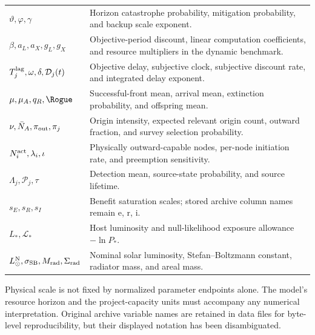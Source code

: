 \begin{longtable}{@{}p{}p{}@{}}
$\vartheta,\varphi,\gamma$ & Horizon catastrophe probability, mitigation probability, and backup scale exponent.\\
$\beta,a_L,a_X,g_L,g_X$ & Objective-period discount, linear computation coefficients, and resource multipliers in the dynamic benchmark.\\
$T_j^{\rm lag},\omega,\delta,\mathcal D_j(t)$ & Objective delay, subjective clock, subjective discount rate, and integrated delay exponent.\\
$\mu,\mu_A,q_R,\Rogue$ & Successful-front mean, arrival mean, extinction probability, and offspring mean.\\
$\nu,\bar N_A,\pi_{\rm out},\pi_j$ & Origin intensity, expected relevant origin count, outward fraction, and survey selection probability.\\
$N_i^{\rm act},\lambda_i,\iota$ & Physically outward-capable nodes, per-node initiation rate, and preemption sensitivity.\\
$\Lambda_j,\mathcal P_j,\tau$ & Detection mean, source-state probability, and source lifetime.\\
$s_E,s_R,s_I$ & Benefit saturation scales; stored archive column names remain e, r, i.\\
$L_*,\mathcal L_*$ & Host luminosity and null-likelihood exposure allowance $-\ln P_*$.\\
$L_\odot^{\rm N},\sigma_{\rm SB},M_{\rm rad},\Sigma_{\rm rad}$ & Nominal solar luminosity, Stefan--Boltzmann constant, radiator mass, and areal mass.\\\bottomrule
\end{longtable}
\normalsize
Physical scale is not fixed by normalized parameter endpoints alone.
The model's resource horizon and the project-capacity units must accompany
any numerical interpretation. Original archive variable names are retained
in data files for byte-level reproducibility, but their displayed notation
has been disambiguated.
